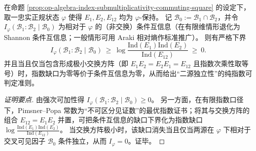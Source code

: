 \begin{corollary}\label{cor:op-algebra-cmi-lower-bound-by-index-gap}
在命题 \ref{prop:op-algebra-index-submultiplicativity-commuting-square} 的设定下，取一忠实正规状态 \(\varphi\) 使得 \(E_1,E_2,E_{12}\) 均为 \(\varphi\)-保持。
记 \(\mathcal{B}_0:=\mathcal{B}_1\cap\mathcal{B}_2\)，并令
\(
I_\varphi(\mathcal{B}_1:\mathcal{B}_2\mid\mathcal{B}_0)
\)
为相对于 \(\varphi\) 的（非交换）条件互信息（在有限维情形退化为 Shannon 条件互信息；一般情形可用 Araki 相对熵作标准推广）。
则有严格下界
\[
\boxed{\;
I_\varphi(\mathcal{B}_1:\mathcal{B}_2\mid\mathcal{B}_0)
\ \ge\
\log\frac{\mathrm{Ind}(E_1)\mathrm{Ind}(E_2)}{\mathrm{Ind}(E_{12})}
\ \ge\ 0.\;}
\]
并且当且仅当包含形成极小交换方阵（即 \(E_1E_2=E_2E_1=E_{12}\) 且指数次乘性取等号）时，指数缺口为零等价于条件互信息为零，从而给出“二源独立性”的纯指数可判定准则。
\end{corollary}
\begin{proof}[证明要点]
由强次可加性得 \(I_\varphi(\mathcal{B}_1:\mathcal{B}_2\mid\mathcal{B}_0)\ge 0\)。
另一方面，在有限指数口径下，Pimsner--Popa 常数为“不可区分见证数”的最优指数证书；将其与交换方阵的组合 \(E_{12}=E_1E_2\) 并置，可把条件互信息的缺口下界化为指数缺口 \(\log\frac{\mathrm{Ind}(E_1)\mathrm{Ind}(E_2)}{\mathrm{Ind}(E_{12})}\)。
当交换方阵极小时，该缺口消失当且仅当两源在 \(\varphi\) 下相对于交叉可见因子 \(\mathcal{B}_0\) 条件独立，从而 \(I_\varphi=0\)。证毕。
\end{proof}

